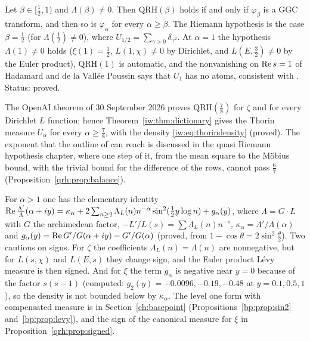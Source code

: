 \begin{corollary}\label{iw:cor:qrh}
Let $\beta\in[\frac12,1)$ and $\Lambda(\beta)\ne0$. Then $\mathrm{QRH}(\beta)$ holds if and only if $\varphi_\beta$ is a GGC transform, and then so is $\varphi_\alpha$ for every $\alpha\ge\beta$. The Riemann hypothesis is the case $\beta=\frac12$ (for $\Lambda(\frac12)\ne0$), where $U_{1/2}=\sum_{\gamma>0}\delta_{\gamma^2}$. At $\alpha=1$ the hypothesis $\Lambda(1)\ne0$ holds ($\xi(1)=\frac12$, $L(1,\chi)\ne0$ by Dirichlet, and $L(E,\frac32)\ne0$ by the Euler product), $\mathrm{QRH}(1)$ is automatic, and the nonvanishing on $\operatorname{Re} s=1$ of Hadamard and de la Vall\'ee Poussin says that $U_1$ has no atoms, consistent with \cite{P17}. Status: proved.
\end{corollary}

The OpenAI theorem of 30 September 2026 \cite{OAI26a} proves $\mathrm{QRH}(\frac78)$ for $\zeta$ and for every Dirichlet $L$ function; hence Theorem~\ref{iw:thm:dictionary} gives the Thorin measure $U_\alpha$ for every $\alpha\ge\frac78$, with the density \eqref{iw:eq:thorindensity} (proved). The exponent that the outline of \cite{OAI26b} can reach is discussed in the quasi Riemann hypothesis chapter, where one step of it, from the mean square to the M\"obius bound, with the trivial bound for the difference of the rows, cannot pass $\frac67$ (Proposition~\ref{qrh:prop:balance}).
\begin{remark}\label{iw:rem:sin2}
For $\alpha>1$ one has the elementary identity $\operatorname{Re}\frac{\Lambda'}{\Lambda}(\alpha+iy)=\kappa_\alpha+2\sum_{n\ge2}\Lambda_L(n)n^{-\alpha}\sin^2(\frac12y\log n)+g_\alpha(y)$, where $\Lambda=G\cdot L$ with $G$ the archimedean factor, $-L'/L(s)=\sum\Lambda_L(n)n^{-s}$, $\kappa_\alpha=\Lambda'/\Lambda(\alpha)$ and $g_\alpha(y)=\operatorname{Re} G'/G(\alpha+iy)-G'/G(\alpha)$ (proved, from $1-\cos\theta=2\sin^2\frac\theta2$). Two cautions on signs. For $\zeta$ the coefficients $\Lambda_L(n)=\Lambda(n)$ are nonnegative, but for $L(s,\chi)$ and $L(E,s)$ they change sign, and the Euler product L\'evy measure is then signed. And for $\xi$ the term $g_\alpha$ is negative near $y=0$ because of the factor $s(s-1)$ (computed: $g_2(y)=-0.0096,-0.19,-0.48$ at $y=0.1,0.5,1$), so the density is not bounded below by $\kappa_\alpha$. The level one form with compensated measure is in Section~\ref{ch:basepoint} (Propositions~\ref{bp:prop:sin2} and~\ref{bp:prop:levy}), and the sign of the canonical measure for $\xi$ in Proposition~\ref{qrh:prop:signed}.
\end{remark}

